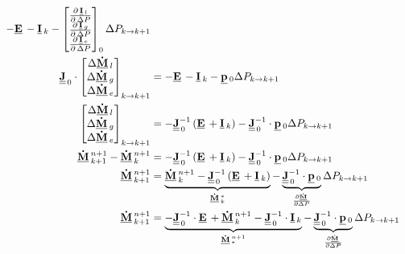 \begin{align}
 -\vec{E} -
 \vec{I}_{k} -
 \begin{bmatrix}
 \DerivParOne{\vec{I}_{l}}{\Delta P} \\
 \DerivParOne{\vec{I}_{g}}{\Delta P} \\
 \DerivParOne{\vec{I}_{e}}{\Delta P}
 \end{bmatrix}_{0}
 \Delta P_{k \rightarrow k+1} \\
 \mat{J}_{\,0}
 \cdot
 \begin{bmatrix}
 \Delta \vec{\dot{M}}_l \\
 \Delta \vec{\dot{M}}_g \\
 \Delta \vec{\dot{M}}_e
 \end{bmatrix}_{k\rightarrow k+1} & =
 -\vec{E} -
 \vec{I}_{k} -
 \vec{p}_{0}
 \Delta P_{k \rightarrow k+1} \\
 \begin{bmatrix}
 \Delta \vec{\dot{M}}_l \\
 \Delta \vec{\dot{M}}_g \\
 \Delta \vec{\dot{M}}_e
 \end{bmatrix}_{k\rightarrow k+1} & =
 -\mat{J}_{\,0}^{-1}\left(\vec{E} + \vec{I}_{k}\right) -
 \mat{J}_{\,0}^{-1} \cdot \vec{p}_{0} \Delta P_{k \rightarrow k+1} \\
 \vec{\dot{M}}^{n+1}_{k+1}- \vec{\dot{M}}^{n+1}_{k} & =
 -\mat{J}_{\,0}^{-1}\left(\vec{E} + \vec{I}_{k}\right) -
 \mat{J}_{\,0}^{-1} \cdot \vec{p}_{0} \Delta P_{k \rightarrow k+1}\\
 \vec{\dot{M}}^{n+1}_{k+1} & =
 \underbrace{\vec{\dot{M}}^{n+1}_{k} -\mat{J}_{\,0}^{-1}\left(\vec{E} + \vec{I}_{k}\right)}_{\vec{\dot{M}}^{*}_{k}} - \underbrace{\mat{J}_{\,0}^{-1} \cdot \vec{p}_{0}}_{\frac{\partial \vec{\dot{M}}}{\partial \Delta P}} \Delta P_{k \rightarrow k+1} \\
 \vec{\dot{M}}^{n+1}_{k+1} & =
 \underbrace{-\mat{J}_{\,0}^{-1}\cdot \vec{E} + \vec{\dot{M}}^{n+1}_{k} - \mat{J}^{-1}_{\,0}\cdot \vec{I}_{k}}_{\vec{\dot{M}}^{n+1}_{*}} - \underbrace{\mat{J}_{\,0}^{-1} \cdot \vec{p}_{0}}_{\frac{\partial \vec{\dot{M}}}{\partial \Delta P}} \Delta P_{k \rightarrow k+1}
 \end{align}

